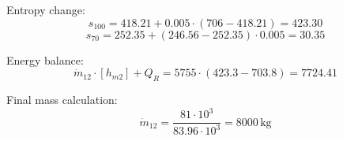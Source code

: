 Entropy change:  
\[
s_{100} = 418.21 + 0.005 \cdot (706 - 418.21) = 423.30
\]
\[
s_{70} = 252.35 + (246.56 - 252.35) \cdot 0.005 = 30.35
\]

Energy balance:  
\[
\dot{m}_{12} \cdot [h_{m2}] + Q_R = 5755 \cdot (423.3 - 703.8) = 7724.41
\]

Final mass calculation:  
\[
\dot{m}_{12} = \frac{81 \cdot 10^3}{83.96 \cdot 10^3} = 8000 \, \text{kg}
\]